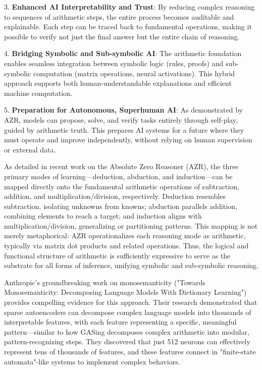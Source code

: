 3. \textbf{Enhanced AI Interpretability and Trust}: By reducing complex reasoning to sequences of arithmetic steps, the entire process becomes auditable and explainable. Each step can be traced back to fundamental operations, making it possible to verify not just the final answer but the entire chain of reasoning.

4. \textbf{Bridging Symbolic and Sub-symbolic AI}: The arithmetic foundation enables seamless integration between symbolic logic (rules, proofs) and sub-symbolic computation (matrix operations, neural activations). This hybrid approach supports both human-understandable explanations and efficient machine computation.

5. \textbf{Preparation for Autonomous, Superhuman AI}: As demonstrated by AZR, models can propose, solve, and verify tasks entirely through self-play, guided by arithmetic truth. This prepares AI systems for a future where they must operate and improve independently, without relying on human supervision or external data.

As detailed in recent work on the Absolute Zero Reasoner (AZR), the three primary modes of learning—deduction, abduction, and induction—can be mapped directly onto the fundamental arithmetic operations of subtraction, addition, and multiplication/division, respectively. Deduction resembles subtraction, isolating unknowns from knowns; abduction parallels addition, combining elements to reach a target; and induction aligns with multiplication/division, generalizing or partitioning patterns. This mapping is not merely metaphorical: AZR operationalizes each reasoning mode as arithmetic, typically via matrix dot products and related operations. Thus, the logical and functional structure of arithmetic is sufficiently expressive to serve as the substrate for all forms of inference, unifying symbolic and sub-symbolic reasoning.

Anthropic's groundbreaking work on monosemanticity ("Towards Monosemanticity: Decomposing Language Models With Dictionary Learning") provides compelling evidence for this approach. Their research demonstrated that sparse autoencoders can decompose complex language models into thousands of interpretable features, with each feature representing a specific, meaningful pattern—similar to how GASing decomposes complex arithmetic into modular, pattern-recognizing steps. They discovered that just 512 neurons can effectively represent tens of thousands of features, and these features connect in "finite-state automata"-like systems to implement complex behaviors.

